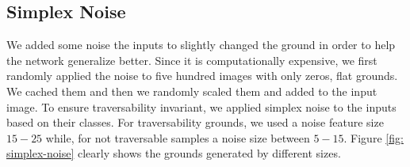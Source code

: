 \documentclass[../document.tex]{subfiles}
\begin{document}
\subsection{Simplex Noise} 
We added some noise the inputs to slightly changed the ground in order to help the network generalize better. Since it is computationally expensive, we first randomly applied the noise to five hundred images with only zeros, flat grounds. We cached them and then we randomly scaled them and added to the input image. To ensure traversability invariant, we applied simplex noise to the inputs based on their classes. For traversability grounds, we used a noise feature size $15 - 25$  while, for not traversable samples a noise size between $5 -15 $. Figure \ref{fig: simplex-noise} clearly shows the grounds generated by different sizes.  
\begin{figure}[htbp]
    \centering


\end{figure}
\end{document}
